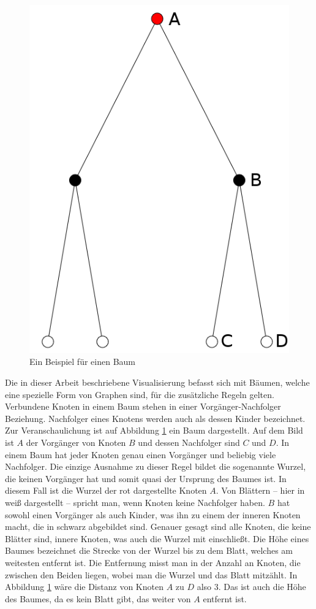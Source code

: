 \begin{figure}
\begin{minipage}{.5\textwidth}
		\includegraphics[width=.9\linewidth]{../screenshots/tree-example.PNG}
		\caption{Ein Beispiel für einen Baum}
		\label{abb:baum}
	\end{minipage}
\end{figure}
Die in dieser Arbeit beschriebene Visualisierung befasst sich mit Bäumen, welche eine spezielle Form von Graphen sind, für die zusätzliche Regeln gelten. Verbundene Knoten in einem Baum stehen in einer Vorgänger-Nachfolger Beziehung. Nachfolger eines Knotens werden auch als dessen Kinder bezeichnet. Zur Veranschaulichung ist auf Abbildung \ref{abb:baum} ein Baum dargestellt. Auf dem Bild ist $A$ der Vorgänger von Knoten $B$ und dessen Nachfolger sind $C$ und $D$. In einem Baum hat jeder Knoten genau einen Vorgänger und beliebig viele Nachfolger. Die einzige Ausnahme zu dieser Regel bildet die sogenannte Wurzel, die keinen Vorgänger hat und somit quasi der Ursprung des Baumes ist. In diesem Fall ist die Wurzel der rot dargestellte Knoten $A$. Von Blättern -- hier in weiß dargestellt -- spricht man, wenn Knoten keine Nachfolger haben. $B$ hat sowohl einen Vorgänger als auch Kinder, was ihn zu einem der inneren Knoten macht, die in schwarz abgebildet sind. Genauer gesagt sind alle Knoten, die keine Blätter sind, innere Knoten, was auch die Wurzel mit einschließt. Die Höhe eines Baumes bezeichnet die Strecke von der Wurzel bis zu dem Blatt, welches am weitesten entfernt ist. Die Entfernung misst man in der Anzahl an Knoten, die zwischen den Beiden liegen, wobei man die Wurzel und das Blatt mitzählt. In Abbildung \ref{abb:baum} wäre die Distanz von Knoten $A$ zu $D$ also 3. Das ist auch die Höhe des Baumes, da es kein Blatt gibt, das weiter von $A$ entfernt ist.

